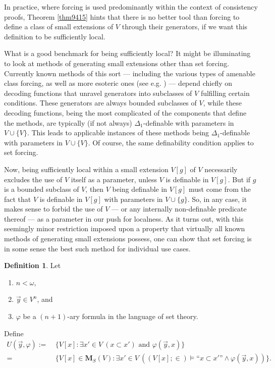\documentclass[12pt, twoside]{memoir}
\numberwithin{equation}{section}
\theoremstyle{definition}
\newtheorem{defi}[thm]{Definition}
\theoremstyle{remark}
\theoremstyle{definition}
\theoremstyle{definition}
\theoremstyle{definition}
\theoremstyle{remark}
\begin{document}
In practice, where forcing is used predominantly within the context of consistency proofs, Theorem \ref{thm9415} hints that there is no better tool than forcing to define a class of small extensions of $V$ through their generators, if we want this definition to be sufficiently local. 

What is a good benchmark for being sufficiently local? It might be illuminating to look at methods of generating small extensions other than set forcing. Currently known methods of this sort --- including the various types of amenable class forcing, as well as more esoteric ones (see e.g. \cite{stanley}) --- depend chiefly on decoding functions that unravel generators into subclasses of $V$ fulfilling certain conditions. These generators are always bounded subclasses of $V$, while these decoding functions, being the most complicated of the components that define the methods, are typically (if not always) $\Delta_1$-definable with parameters in $V \cup \{V\}$. This leads to applicable instances of these methods being $\Delta_1$-definable with parameters in $V \cup \{V\}$. Of course, the same definability condition applies to set forcing.

Now, being sufficiently local within a small extension $V[g]$ of $V$ necessarily excludes the use of $V$ itself as a parameter, unless $V$ is definable in $V[g]$. But if $g$ is a bounded subclass of $V$, then $V$ being definable in $V[g]$ must come from the fact that $V$ is definable in $V[g]$ with parameters in $V \cup \{g\}$. So, in any case, it makes sense to forbid the use of $V$ --- or any internally non-definable predicate thereof --- as a parameter in our push for localness. As it turns out, with this seemingly minor restriction imposed upon a property that virtually all known methods of generating small extensions possess, one can show that set forcing is in some sense the best such method for individual use cases.

\begin{defi}
Let 
\begin{enumerate}[label=(\alph*)]
    \item $n < \omega$,
    \item $\Vec{y} \in V^n$, and
    \item $\varphi$ be a $(n + 1)$-ary formula in the language of set theory.
\end{enumerate}
Define 
\begin{align*}
    U(\Vec{y}, \varphi) := \ & \{V[x] : \exists x' \in V \ (x \subset x') \text{ and } \varphi (\Vec{y}, x) \} \\
    = \ & \{V[x] \in \mathbf{M}_S(V) : \exists x' \in V \ ((V[x]; \in) \models \text{``} x \subset x' \text{''} \wedge \varphi (\Vec{y}, x)) \} \text{.}
\end{align*}
\end{defi}
\end{document}
